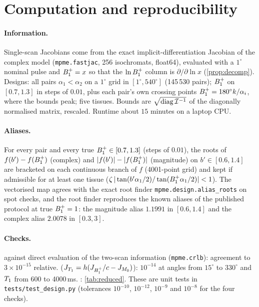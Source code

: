 \section{Computation and reproducibility}\label{app:repro}

\paragraph{Information.} Single-scan Jacobians come from the exact implicit-differentiation
Jacobian of the complex model (\texttt{mpme.fastjac}, 256 isochromats, float64), evaluated with a
$1^\circ$ nominal pulse and $B_1^{+}=x$ so that the $\ln B_1^{+}$ column is $\partial/\partial\ln x$
(\cref{prop:decomp}). Designs: all pairs $\alpha_1<\alpha_2$ on a $1^\circ$ grid in $[1^\circ,540^\circ]$ (145\,530
pairs); $B_1^{+}$ on $[0.7,1.3]$ in steps of $0.01$, plus each pair's own crossing points
$B_1^{+}=180^\circ k/\alpha_i$, where the bounds peak; five tissues. Bounds are $\sqrt{\operatorname{diag}\mathcal{I}^{-1}}$ of the
diagonally normalised matrix, rescaled. Runtime about $15$ minutes on a laptop CPU.

\paragraph{Aliases.} For every pair and every true $B_1^{+}\in[0.7,1.3]$ (steps of $0.01$), the roots of
$f(b')-f(B_1^{+})$ (complex) and $|f(b')|-|f(B_1^{+})|$ (magnitude) on $b'\in[0.6,1.4]$ are bracketed on each
continuous branch of $f$ (4001-point grid) and kept if admissible for at least one tissue
($\zeta\,|\tan(b'\alpha_1/2)/\tan(B_1^{+}\alpha_1/2)|<1$). The vectorised map agrees with the exact root finder
\texttt{mpme.design.alias\_roots} on spot checks, and the root finder reproduces the known aliases
of the published protocol at true $B_1^{+}=1$: the magnitude alias $1.1991$ in $[0.6,1.4]$ and the complex alias
$2.0078$ in $[0.3,3]$.

\paragraph{Checks.}  against direct evaluation of the two-scan information
(\texttt{mpme.crlb}): agreement to $3\times10^{-15}$ relative.  ($J_{T_1}=h(J_{B_1^{+}}/c-J_{M_0})$):
$10^{-14}$ at angles from $15^\circ$ to $330^\circ$ and $T_1$ from 600 to 4000\,ms. :
\cref{tab:reduced}. These are unit tests in \texttt{tests/test\_design.py} (tolerances $10^{-10}$, $10^{-12}$, $10^{-9}$ and $10^{-8}$
for the four checks).

